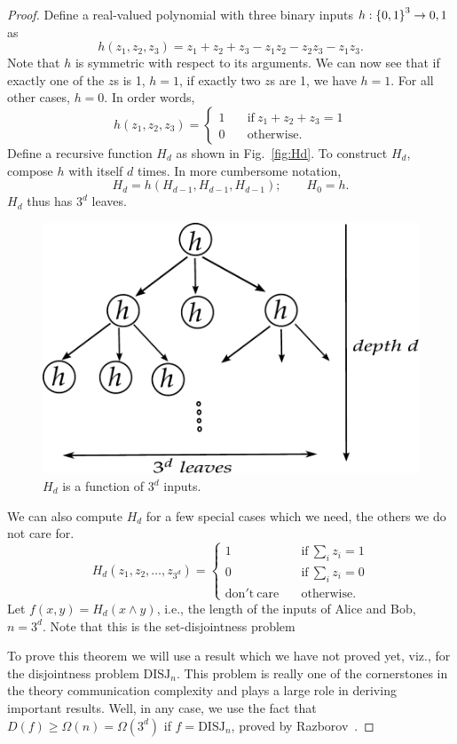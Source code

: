 \documentclass[usletter]{article}
\providecommand\cbrac[1]{\ensuremath \left\{#1\right\}}
\providecommand{\aand}{\wedge}
\newcommand{\df}{D(f)}
\newcommand{\DISJ}{\mathrm{DISJ}}
\newcommand{\pc}[2]{{\color{brown} #1}\marginpar{\tiny\noindent{\raggedright{\color{ForestGreen}[PC]}\color{brown}{ #2} \par}}}
\begin{document}
\begin{proof}
Define a real-valued polynomial with three binary inputs $h : \cbrac{0,1}^3 \to {0,1}$ as
$$
h(z_1, z_2, z_3) = z_1 + z_2 + z_3 - z_1 z_2 - z_2 z_3 - z_1 z_3.
$$
Note that $h$ is symmetric with respect to its arguments. We can now see that if exactly one of the $z$s is 1, $h = 1$, if exactly two $z$s are 1, we have $h = 1$. For all other cases, $h = 0$. In order words,
$$
h(z_1, z_2, z_3) = 
\begin{cases}
1 & \quad \mathrm{if}\ z_1 + z_2 + z_3 = 1\\
0 & \quad \mathrm{otherwise}.
\end{cases}
$$
Define a recursive function $H_d$ as shown in Fig.~\ref{fig:Hd}. To construct $H_d$, compose $h$ with itself $d$ times. In more cumbersome notation,
$$
H_d = h(H_{d-1}, H_{d-1}, H_{d-1}); \qquad H_0 = h.
$$
$H_d$ thus has $3^d$ leaves.

\begin{figure}
\centering
\includegraphics[width=0.5 \textwidth]{H_d.pdf}
\caption{$H_d$ is a function of $3^d$ inputs.}
\label{fig:H_d}
\end{figure}

We can also compute $H_d$ for a few special cases which we need, the others we do not care for.
$$
H_d(z_1, z_2, \ldots, z_{3^d}) =
\begin{cases}
1 & \quad \mathrm{if}\ \sum_{i} z_i = 1\\
0 & \quad \mathrm{if}\ \sum_{i} z_i = 0\\
\mathrm{don't\ care} & \quad \mathrm{otherwise}.
\end{cases}
$$
Let $f(x,y) = H_d(x \aand y)$, i.e., the length of the inputs of Alice and Bob, $n = 3^d$. \pc{Note that this is the set-disjointness problem}{}

To prove this theorem we will use a result which we have not proved yet, viz., for the disjointness problem $\DISJ_n$. This problem is really one of the cornerstones in the theory communication complexity and plays a large role in deriving important results. Well, in any case, we use the fact that $\df \geq \Omega(n) = \Omega(3^d)$ if $f = \DISJ_n$, proved by Razborov~\cite{razborov1992distributional}.


\end{proof}
\end{document}

